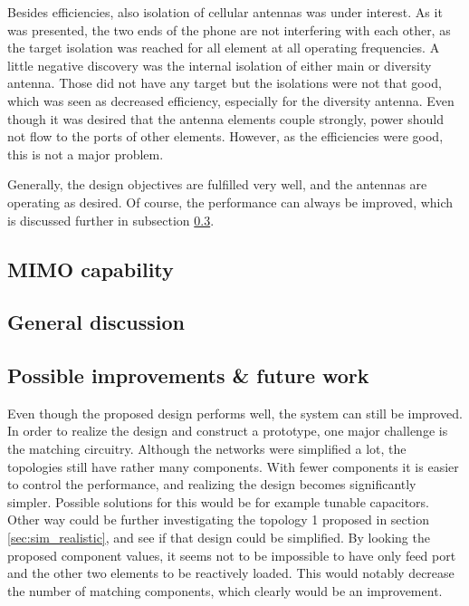 Besides efficiencies, also isolation of cellular antennas was under interest. As it was presented, the two ends of the phone are not interfering with each other, as the target isolation was reached for all element at all operating frequencies. A little negative discovery was the internal isolation of either main or diversity antenna. Those did not have any target but the isolations were not that good, which was seen as decreased efficiency, especially for the diversity antenna. Even though it was desired that the antenna elements couple strongly, power should not flow to the ports of other elements. However, as the efficiencies were good, this is not a major problem.

Generally, the design objectives are fulfilled very well, and the antennas are operating as desired. Of course, the performance can always be improved, which is discussed further in subsection \ref{sec:improvements}.

\subsection{MIMO capability}
\label{sec:mimo_cap}



\subsection{General discussion}
\label{sec:general_discussion}



\subsection{Possible improvements \& future work}
\label{sec:improvements}
Even though the proposed design performs well, the system can still be improved. In order to realize the design and construct a prototype, one major challenge is the matching circuitry. Although the networks were simplified a lot, the topologies still have rather many components. With fewer components it is easier to control the performance, and realizing the design becomes significantly simpler. Possible solutions for this would be for example tunable capacitors. Other way could be further investigating the topology 1 proposed in section \ref{sec:sim_realistic}, and see if that design could be simplified. By looking the proposed component values, it seems not to be impossible to have only feed port and the other two elements to be reactively loaded. This would notably decrease the number of matching components, which clearly would be an improvement.

